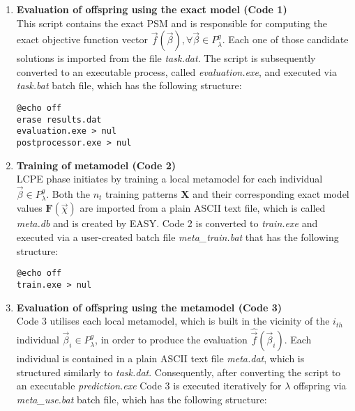\begin{enumerate}

\item \textbf{ Evaluation of offspring using the exact 
model (Code 1)} \\
This script contains the exact PSM and is responsible for 
computing the exact objective function vector $\vec{f}(\vec{β}), 
\forall \vec{β} \in P_{λ}^{g}$. Each one of those candidate 
solutions is imported from the file \textit{task.dat}. The script 
is subsequently converted to an executable process, called 
\textit{evaluation.exe}, and executed via \textit{task.bat} batch 
file, which has the following structure:

\begin{lstlisting}[language = command.com, caption = Structure of 
\textit{task.bat} file that initiates the exact evaluation of 
offspring]
@echo off
erase results.dat 
evaluation.exe > nul 
postprocessor.exe > nul
\end{lstlisting}

\item \textbf{Training of metamodel (Code 2)} \\
LCPE phase initiates by training a local metamodel for 
each individual $\vec{β} \in P_{λ}^{g}$. Both the $n_{t}$ 
training patterns $\mathbf{X}$ and their corresponding exact 
model values $\mathbf{F}(\vec{χ})$ are imported from a plain 
ASCII text file, which is called \textit{meta.db} and is 
created by EASY. Code 2 is converted to \textit{train.exe} 
and executed via a user-created batch file 
\textit{meta\_train.bat} that has the following structure:

\begin{lstlisting}[language = command.com, caption =Structure of 
\textit{meta\_train.bat} file that initiates training of the 
metamodel]
@echo off
train.exe > nul 
\end{lstlisting}

\item \textbf{Evaluation of offspring using the metamodel 
(Code 3)} \\
Code 3 utilises each local metamodel, which is built 
in the vicinity of the $i_{th}$ individual $\vec{β}_{i} \!\in 
\!P_{λ}^{g}$, in order to produce the evaluation 
$\hat{\vec{f}}(\vec{β}_{i})$. Each individual is 
contained in a plain ASCII text file \textit{meta.dat}, 
which is structured similarly to \textit{task.dat}. 
Consequently, after converting the script to an executable 
\textit{prediction.exe} Code 3 is executed iteratively
for $λ$ offspring via \textit{meta\_use.bat} batch file, 
which has the following structure: 


\end{enumerate}
